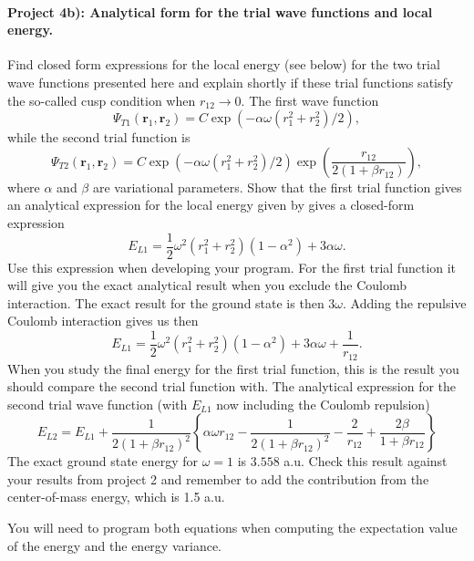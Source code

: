 \documentclass[%
oneside,                 %
final,                   %
10pt]{article}
\begin{document}
\paragraph{Project 4b): Analytical form for the trial wave functions and local energy.}
Find closed form expressions for the local energy (see below) for the 
two trial wave functions presented here and explain shortly if these
trial functions satisfy 
the so-called cusp condition when $r_{12}\rightarrow 0$.
The first wave function
\[
   \Psi_{T1}(\mathbf{r}_1,\mathbf{r}_2) = C\exp{\left(-\alpha\omega(r_1^2+r_2^2)/2\right)},
\]
while the second trial function is
\[
    \Psi_{T2}(\mathbf{r}_1,\mathbf{r}_2) =
    C\exp{\left(-\alpha\omega(r_1^2+r_2^2)/2\right)}
    \exp{\left(\frac{r_{12}}{2(1+\beta r_{12})}\right)},
\]
where $\alpha$ and $\beta$ are variational parameters.
Show that the first trial function gives an analytical expression for the local energy given by
gives a closed-form expression
\[ 
E_{L1} = \frac{1}{2}\omega^2\left( r_1^2+r_2^2\right)\left(1-\alpha^2\right) +3\alpha\omega.
\]
Use this expression when developing your program. 
For the first trial function it will give you the exact analytical result when you exclude the Coulomb interaction. The exact result for the ground state is then $3\omega$. 
Adding the repulsive Coulomb interaction gives us then
\[ 
E_{L1} = \frac{1}{2}\omega^2\left( r_1^2+r_2^2\right)\left(1-\alpha^2\right) +3\alpha\omega+\frac{1}{r_{12}}.
\]
When you study the final energy for the first trial function, this is the result you should compare the second trial function with.
The analytical expression for the second trial wave function (with $E_{L1}$ now including the Coulomb repulsion)
\[ 
E_{L2} = E_{L1}+\frac{1}{2(1+\beta r_{12})^2}\left\{\alpha\omega r_{12}-\frac{1}{2(1+\beta r_{12})^2}-\frac{2}{r_{12}}+\frac{2\beta}{1+\beta r_{12}}\right\}
\]
The exact ground state energy for $\omega =1 $ is $3.558$ a.u. Check this result against your results from project 2 and remember to add the contribution from the center-of-mass energy, which is 1.5 a.u.

You will need to program both equations when computing the expectation value of the energy and the energy variance.
\end{document}
